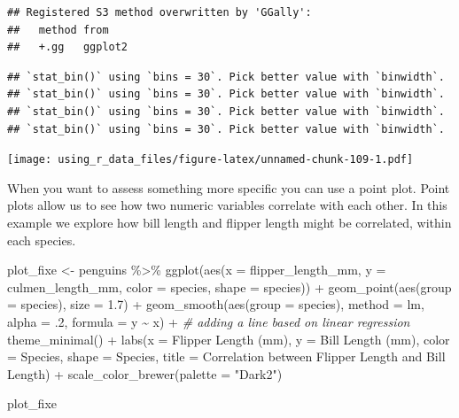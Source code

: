 \documentclass[
]{book}
\newenvironment{Shaded}{\begin{snugshade}}{\end{snugshade}}
\newcommand{\AttributeTok}[1]{\textcolor[rgb]{0.77,0.63,0.00}{#1}}
\newcommand{\CommentTok}[1]{\textcolor[rgb]{0.56,0.35,0.01}{\textit{#1}}}
\newcommand{\DecValTok}[1]{\textcolor[rgb]{0.00,0.00,0.81}{#1}}
\newcommand{\FloatTok}[1]{\textcolor[rgb]{0.00,0.00,0.81}{#1}}
\newcommand{\FunctionTok}[1]{\textcolor[rgb]{0.00,0.00,0.00}{#1}}
\newcommand{\NormalTok}[1]{#1}
\newcommand{\OtherTok}[1]{\textcolor[rgb]{0.56,0.35,0.01}{#1}}
\newcommand{\SpecialCharTok}[1]{\textcolor[rgb]{0.00,0.00,0.00}{#1}}
\newcommand{\StringTok}[1]{\textcolor[rgb]{0.31,0.60,0.02}{#1}}
\begin{document}
\begin{verbatim}
## Registered S3 method overwritten by 'GGally':
##   method from   
##   +.gg   ggplot2
\end{verbatim}

\begin{verbatim}
## `stat_bin()` using `bins = 30`. Pick better value with `binwidth`.
## `stat_bin()` using `bins = 30`. Pick better value with `binwidth`.
## `stat_bin()` using `bins = 30`. Pick better value with `binwidth`.
## `stat_bin()` using `bins = 30`. Pick better value with `binwidth`.
\end{verbatim}

\texttt{[image: using\_r\_data\_files/figure-latex/unnamed-chunk-109-1.pdf]}

When you want to assess something more specific you can use a point plot.
Point plots allow us to see how two numeric variables correlate with each other.
In this example we explore how bill length and flipper length might be correlated, within each species.

\begin{Shaded}
\begin{Highlighting}[]
\NormalTok{plot\_fixe }\OtherTok{\textless{}{-}}\NormalTok{ penguins }\SpecialCharTok{\%\textgreater{}\%} 
  \FunctionTok{ggplot}\NormalTok{(}\FunctionTok{aes}\NormalTok{(}\AttributeTok{x =}\NormalTok{ flipper\_length\_mm, }\AttributeTok{y =}\NormalTok{ culmen\_length\_mm, }\AttributeTok{color =}\NormalTok{ species, }\AttributeTok{shape =}\NormalTok{ species)) }\SpecialCharTok{+} 
  \FunctionTok{geom\_point}\NormalTok{(}\FunctionTok{aes}\NormalTok{(}\AttributeTok{group =}\NormalTok{ species), }\AttributeTok{size =} \FloatTok{1.7}\NormalTok{) }\SpecialCharTok{+}
  \FunctionTok{geom\_smooth}\NormalTok{(}\FunctionTok{aes}\NormalTok{(}\AttributeTok{group =}\NormalTok{ species), }\AttributeTok{method =} \StringTok{\textquotesingle{}lm\textquotesingle{}}\NormalTok{, }\AttributeTok{alpha =}\NormalTok{ .}\DecValTok{2}\NormalTok{, }\AttributeTok{formula =} \StringTok{\textquotesingle{}y \textasciitilde{} x\textquotesingle{}}\NormalTok{) }\SpecialCharTok{+} \CommentTok{\# adding a line based on linear regression}
  \FunctionTok{theme\_minimal}\NormalTok{() }\SpecialCharTok{+}
  \FunctionTok{labs}\NormalTok{(}\AttributeTok{x =} \StringTok{\textquotesingle{}Flipper Length (mm)\textquotesingle{}}\NormalTok{, }\AttributeTok{y =} \StringTok{\textquotesingle{}Bill Length (mm)\textquotesingle{}}\NormalTok{,}
       \AttributeTok{color =} \StringTok{\textquotesingle{}Species\textquotesingle{}}\NormalTok{, }\AttributeTok{shape =} \StringTok{\textquotesingle{}Species\textquotesingle{}}\NormalTok{,}
       \AttributeTok{title =} \StringTok{\textquotesingle{}Correlation between Flipper Length and Bill Length\textquotesingle{}}\NormalTok{) }\SpecialCharTok{+}
  \FunctionTok{scale\_color\_brewer}\NormalTok{(}\AttributeTok{palette =} \StringTok{"Dark2"}\NormalTok{)}

\NormalTok{plot\_fixe}
\end{Highlighting}
\end{Shaded}
\end{document}
